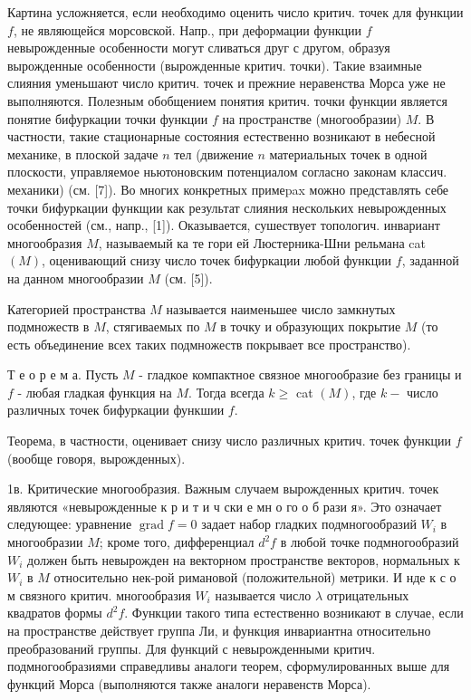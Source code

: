 \documentclass[10pt]{article}
\begin{document}
Картина усложняется, если необходимо оценить число критич. точек для функции $f$, не являющейся морсовской. Напр., при деформации функции $f$ невырожденные особенности могут сливаться друг с другом, образуя вырожденные особенности (вырожденные критич. точки). Такие взаимные слияния уменьшают число критич. точек и прежние неравенства Морса уже не выполняются. Полезным обобщением понятия критич. точки функции является понятие бифуркации точки функции $f$ на пространстве (многообразии) $M$. В частности, такие стационарные состояния естественно возникают в небесной механике, в плоской задаче $n$ тел (движение $n$ материальных точек в одной плоскости, управляемое ньютоновским потенциалом согласно законам классич. механики) (см. [7]). Во многих конкретных примеpax можно представлять себе точки бифуркации функщии как результат слияния нескольких невырожденных особенностей (см., напр., [1]). Оказывается, сушествует топологич. инвариант многообразия $M$, называемый ка те гори ей Люстерника-Шни рельмана cat $(M)$, оценивающий снизу число точек бифуркации любой функции $f$, заданной на данном многообразии $M$ (см. [5]).



Категорией пространства $M$ называется наименьшее число замкнутых подмножеств в $M$, стягиваемых по $M$ в точку и образующих покрытие $M$ (то есть объединение всех таких подмножеств покрывает все пространство).



Т е о р е м а. Пусть $M$ - гладкое компактное связное многообразие без границы и $f$ - любая гладкая функция на $M$. Тогда всегда $k \geqslant$ cat $(M)$, где $k-$ число различных точек бифуркации функшии $f$.



Теорема, в частности, оценивает снизу число различных критич. точек функции $f$ (вообще говоря, вырожденных).



1в. Критические многообразия. Важным случаем вырожденных критич. точек являются «невырожденные к р и т и ч ски е мн о го о б рази я». Это означает следующее: уравнение $\operatorname{grad} f=0$ задает набор гладких подмногообразий $W_{i}$ в многообразии $M$; кроме того, дифференциал $d^{2} f$ в любой точке подмногообразий $W_{i}$ должен быть невырожден на векторном пространстве векторов, нормальных к $W_{i}$ в $M$ относительно нек-рой римановой (положительной) метрики. И нде к с о м связного критич. многообразия $W_{i}$ называется число $\lambda$ отрицательных квадратов формы $d^{2} f$. Функции такого типа естественно возникают в случае, если на пространстве действует группа Ли, и функция инвариантна относительно преобразований группы. Для функций с невырожденными критич. подмногообразиями справедливы аналоги теорем, сформулированных выше для функций Морса (выполняются также аналоги неравенств Морса).
\end{document}
